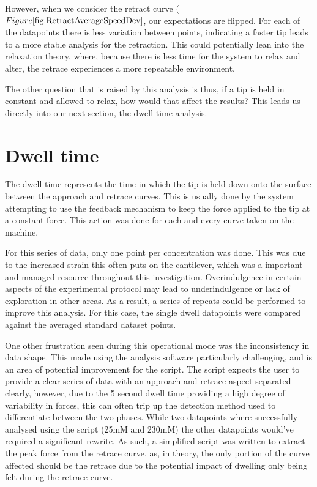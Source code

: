 However, when we consider the retract curve ($Figure \ref{fig:RetractAverageSpeedDev}$, our expectations are flipped. For each of the datapoints there is less variation between points, indicating a faster tip leads to a more stable analysis for the retraction. This could potentially lean into the relaxation theory, where, because there is less time for the system to relax and alter, the retrace experiences a more repeatable environment.

The other question that is raised by this analysis is thus, if a tip is held in constant and allowed to relax, how would that affect the results? This leads us directly into our next section, the dwell time analysis.

\section{Dwell time}

The dwell time represents the time in which the tip is held down onto the surface between the approach and retrace curves. This is usually done by the system attempting to use the feedback mechanism to keep the force applied to the tip at a constant force. This action was done for each and every curve taken on the machine.

For this series of data, only one point per concentration was done. This was due to the increased strain this often puts on the cantilever, which was a important and managed resource throughout this investigation. Overindulgence in certain aspects of the experimental protocol may lead to underindulgence or lack of exploration in other areas. As a result, a series of repeats could be performed to improve this analysis. For this case, the single dwell datapoints were compared against the averaged standard dataset points.

One other frustration seen during this operational mode was the inconsistency in data shape. This made using the analysis software particularly challenging, and is an area of potential improvement for the script. The script expects the user to provide a clear series of data with an approach and retrace aspect separated clearly, however, due to the 5 second dwell time providing a high degree of variability in forces, this can often trip up the detection method used to differentiate between the two phases. While two datapoints where successfully analysed using the script (25mM and 230mM) the other datapoints would've required a significant rewrite. As such, a simplified script was written to extract the peak force from the retrace curve, as, in theory, the only portion of the curve affected should be the retrace due to the potential impact of dwelling only being felt during the retrace curve.

